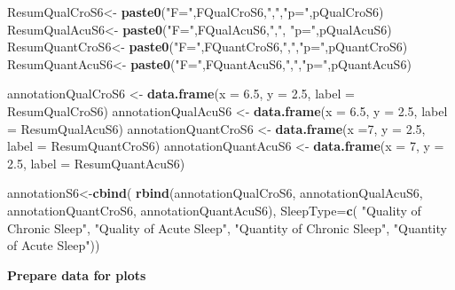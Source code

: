 \documentclass[
]{book}
\newenvironment{Shaded}{\begin{snugshade}}{\end{snugshade}}
\newcommand{\DataTypeTok}[1]{\textcolor[rgb]{0.13,0.29,0.53}{#1}}
\newcommand{\DecValTok}[1]{\textcolor[rgb]{0.00,0.00,0.81}{#1}}
\newcommand{\FloatTok}[1]{\textcolor[rgb]{0.00,0.00,0.81}{#1}}
\newcommand{\KeywordTok}[1]{\textcolor[rgb]{0.13,0.29,0.53}{\textbf{#1}}}
\newcommand{\NormalTok}[1]{#1}
\newcommand{\StringTok}[1]{\textcolor[rgb]{0.31,0.60,0.02}{#1}}
\begin{document}
\begin{Shaded}
\begin{Highlighting}[]
\NormalTok{ResumQualCroS6<-}\StringTok{ }\KeywordTok{paste0}\NormalTok{(}\StringTok{"F="}\NormalTok{,FQualCroS6,}\StringTok{","}\NormalTok{,}\StringTok{"p="}\NormalTok{,pQualCroS6)}
\NormalTok{ResumQualAcuS6<-}\StringTok{ }\KeywordTok{paste0}\NormalTok{(}\StringTok{"F="}\NormalTok{,FQualAcuS6,}\StringTok{","}\NormalTok{, }\StringTok{"p="}\NormalTok{,pQualAcuS6)}
\NormalTok{ResumQuantCroS6<-}\StringTok{ }\KeywordTok{paste0}\NormalTok{(}\StringTok{"F="}\NormalTok{,FQuantCroS6,}\StringTok{","}\NormalTok{,}\StringTok{"p="}\NormalTok{,pQuantCroS6)}
\NormalTok{ResumQuantAcuS6<-}\StringTok{ }\KeywordTok{paste0}\NormalTok{(}\StringTok{"F="}\NormalTok{,FQuantAcuS6,}\StringTok{","}\NormalTok{,}\StringTok{"p="}\NormalTok{,pQuantAcuS6)}

\NormalTok{annotationQualCroS6 <-}\StringTok{ }\KeywordTok{data.frame}\NormalTok{(}\DataTypeTok{x =} \FloatTok{6.5}\NormalTok{, }\DataTypeTok{y =} \FloatTok{2.5}\NormalTok{,  }\DataTypeTok{label =}\NormalTok{ ResumQualCroS6)}
\NormalTok{annotationQualAcuS6 <-}\StringTok{ }\KeywordTok{data.frame}\NormalTok{(}\DataTypeTok{x =} \FloatTok{6.5}\NormalTok{, }\DataTypeTok{y =} \FloatTok{2.5}\NormalTok{,  }\DataTypeTok{label =}\NormalTok{ ResumQualAcuS6)}
\NormalTok{annotationQuantCroS6 <-}\StringTok{ }\KeywordTok{data.frame}\NormalTok{(}\DataTypeTok{x =}\DecValTok{7}\NormalTok{, }\DataTypeTok{y =} \FloatTok{2.5}\NormalTok{,  }\DataTypeTok{label =}\NormalTok{ ResumQuantCroS6)}
\NormalTok{annotationQuantAcuS6 <-}\StringTok{ }\KeywordTok{data.frame}\NormalTok{(}\DataTypeTok{x =} \DecValTok{7}\NormalTok{, }\DataTypeTok{y =} \FloatTok{2.5}\NormalTok{,  }\DataTypeTok{label =}\NormalTok{ ResumQuantAcuS6)}

\NormalTok{annotationS6<-}\KeywordTok{cbind}\NormalTok{(}
  \KeywordTok{rbind}\NormalTok{(annotationQualCroS6, }
\NormalTok{        annotationQualAcuS6, }
\NormalTok{        annotationQuantCroS6, }
\NormalTok{        annotationQuantAcuS6),}
  \DataTypeTok{SleepType=}\KeywordTok{c}\NormalTok{(}
        \StringTok{"Quality of Chronic Sleep"}\NormalTok{, }
        \StringTok{"Quality of Acute Sleep"}\NormalTok{, }
        \StringTok{"Quantity of Chronic Sleep"}\NormalTok{, }
        \StringTok{"Quantity of Acute Sleep"}\NormalTok{))}
\end{Highlighting}
\end{Shaded}

\textbf{Prepare data for plots}
\end{document}
